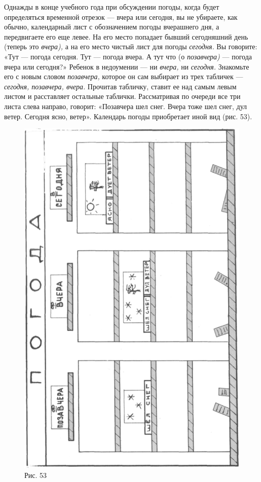 \documentclass{book}
\renewcommand{\emph}[1]{\textit{#1}}
\begin{document}
Однажды в конце учебного года при обсуждении погоды, когда будет
определяться временной отрезок --- вчера или сегодня, вы не убираете,
как обычно, календарный лист с обозначением погоды вчерашнего дня, а
передвигаете его еще левее. На его место попадает бывший сегодняшний
день (теперь это \emph{вчера),} а на его место чистый лист для погоды
\emph{сегодня.} Вы говорите: «Тут --- погода сегодня. Тут --- погода
вчера. А тут что (о \emph{позавчера)} --- погода вчера или сегодня?»
Ребенок в недоумении --- ни \emph{вчера,} ни \emph{сегодня.} Знакомьте
его с новым словом \emph{позавчера,} которое он сам выбирает из трех
табличек --- \emph{сегодня, позавчера, вчера.} Прочитав табличку, ставит
ее над самым левым листом и расставляет остальные таблички. Рассматривая
по очереди все три листа слева направо, говорит: «Позавчера шел снег.
Вчера тоже шел снег, дул ветер. Сегодня ясно, ветер». Календарь погоды
приобретает иной вид (рис. 53).

\begin{figure}
\centering
\includegraphics[width=0.9\linewidth]{media/media/image49.png}
\caption*{Рис. 53}
\end{figure}
\end{document}
